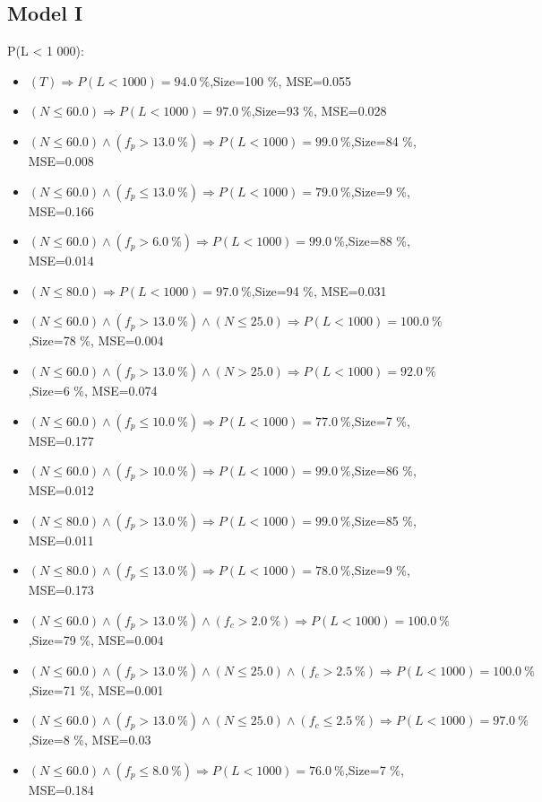 \documentclass[numbered]{CSL}
\begin{document}
\subsection{Model I}
P(L < 1 000):
\begin{itemize}
\item $(T) \Rightarrow P(L < 1 000) = 94.0~\%$,\hfill Size=100 \%, MSE=0.055
\item $(N \leq 60.0) \Rightarrow P(L < 1 000) = 97.0~\%$,\hfill Size=93 \%, MSE=0.028
\item $(N \leq 60.0) \land (f_p > 13.0~\%) \Rightarrow P(L < 1 000) = 99.0~\%$,\hfill Size=84 \%, MSE=0.008
\item $(N \leq 60.0) \land (f_p \leq 13.0~\%) \Rightarrow P(L < 1 000) = 79.0~\%$,\hfill Size=9 \%, MSE=0.166
\item $(N \leq 60.0) \land (f_p > 6.0~\%) \Rightarrow P(L < 1 000) = 99.0~\%$,\hfill Size=88 \%, MSE=0.014
\item $(N \leq 80.0) \Rightarrow P(L < 1 000) = 97.0~\%$,\hfill Size=94 \%, MSE=0.031
\item $(N \leq 60.0) \land (f_p > 13.0~\%) \land (N \leq 25.0) \Rightarrow P(L < 1 000) = 100.0~\%$,\hfill Size=78 \%, MSE=0.004
\item $(N \leq 60.0) \land (f_p > 13.0~\%) \land (N > 25.0) \Rightarrow P(L < 1 000) = 92.0~\%$,\hfill Size=6 \%, MSE=0.074
\item $(N \leq 60.0) \land (f_p \leq 10.0~\%) \Rightarrow P(L < 1 000) = 77.0~\%$,\hfill Size=7 \%, MSE=0.177
\item $(N \leq 60.0) \land (f_p > 10.0~\%) \Rightarrow P(L < 1 000) = 99.0~\%$,\hfill Size=86 \%, MSE=0.012
\item $(N \leq 80.0) \land (f_p > 13.0~\%) \Rightarrow P(L < 1 000) = 99.0~\%$,\hfill Size=85 \%, MSE=0.011
\item $(N \leq 80.0) \land (f_p \leq 13.0~\%) \Rightarrow P(L < 1 000) = 78.0~\%$,\hfill Size=9 \%, MSE=0.173
\item $(N \leq 60.0) \land (f_p > 13.0~\%) \land (f_c > 2.0~\%) \Rightarrow P(L < 1 000) = 100.0~\%$,\hfill Size=79 \%, MSE=0.004
\item $(N \leq 60.0) \land (f_p > 13.0~\%) \land (N \leq 25.0) \land (f_c > 2.5~\%) \Rightarrow P(L < 1 000) = 100.0~\%$,\hfill Size=71 \%, MSE=0.001
\item $(N \leq 60.0) \land (f_p > 13.0~\%) \land (N \leq 25.0) \land (f_c \leq 2.5~\%) \Rightarrow P(L < 1 000) = 97.0~\%$,\hfill Size=8 \%, MSE=0.03
\item $(N \leq 60.0) \land (f_p \leq 8.0~\%) \Rightarrow P(L < 1 000) = 76.0~\%$,\hfill Size=7 \%, MSE=0.184

\end{itemize}
\end{document}
